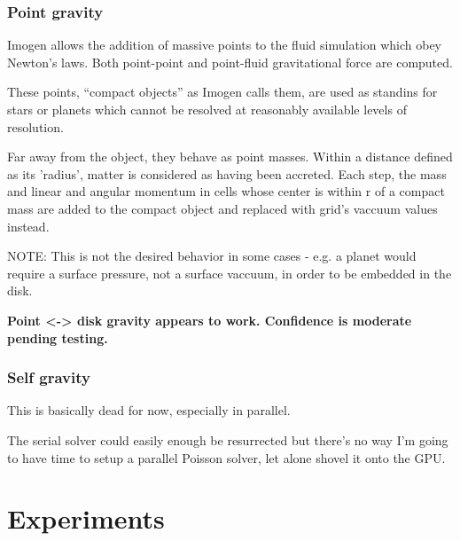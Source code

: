 \documentclass[letterpaper,12pt,twocolumn]{article}
\begin{document}
\subsubsection{Point gravity}

Imogen allows the addition of massive points to the fluid simulation which obey Newton's
laws. Both point-point and point-fluid gravitational force are computed.

These points, ``compact objects'' as Imogen calls them, are used as standins for stars
or planets which cannot be resolved at reasonably available levels of resolution.

Far away from the object, they behave as point masses. Within a distance defined as
its 'radius', matter is considered as having been accreted. Each step, the mass and
linear and angular momentum in cells whose center is within r of a compact mass
are added to the compact object and replaced with grid's vaccuum values instead.

NOTE: This is not the desired behavior in some cases - e.g. a planet would require a surface
pressure, not a surface vaccuum, in order to be embedded in the disk.

\textbf{Point <-> disk gravity appears to work. Confidence is moderate pending testing.}

\subsubsection{Self gravity}

This is basically dead for now, especially in parallel.

The serial solver could easily enough be resurrected but there's no way I'm going
to have time to setup a parallel Poisson solver, let alone shovel it onto the GPU.

\section{Experiments}





\end{document}
